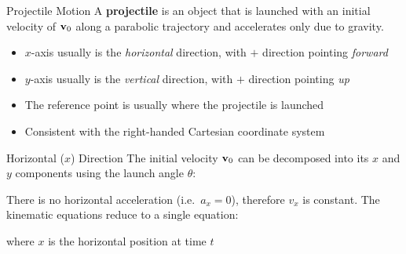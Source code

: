 \documentclass[12pt,compress,aspectratio=169]{beamer}
\newcommand{\iii}{\ensuremath\hat{\bm{\imath}}}
\newcommand{\jjj}{\ensuremath\hat{\bm{\jmath}}}
\newcommand{\mb}[1]{\ensuremath\mathbf{#1}}
\newcommand{\eq}[2]{\vspace{#1}{\Large\begin{displaymath}#2\end{displaymath}}}
\begin{document}
\begin{frame}{Projectile Motion}
  A \textbf{projectile} is an object that is launched with an initial velocity
  of $\mb{v}_0$ along a parabolic trajectory and accelerates only due to
  gravity.
  \begin{center}
  \end{center}
  \begin{itemize}
  \item $x$-axis usually is the \emph{horizontal} direction, with $+$ direction
    pointing \emph{forward}
  \item $y$-axis usually is the \emph{vertical} direction, with $+$ direction
    pointing \emph{up}
  \item The reference point is usually where the projectile is launched
  \item Consistent with the right-handed Cartesian coordinate system
  \end{itemize}
\end{frame}



\begin{frame}{Horizontal ($x$) Direction}
  The initial velocity $\mb{v}_0$ can be decomposed into its $x$ and $y$
  components using the launch angle $\theta$:

  \eq{-.2in}{
    \mb{v}_0=v_x\iii + v_{y0}\jjj =
    \left[v_0\cos\theta\right]\iii + \left[v_0\sin\theta\right]\jjj
  }

  There is no horizontal acceleration (i.e.\ $a_x=0$), therefore $v_x$ is
  constant. The kinematic equations reduce to a single equation:

  \eq{-.2in}{
    x=v_xt=\left[v_0\cos\theta\right] t
  }

  where $x$ is the horizontal position at time $t$ %
\end{frame}
\end{document}
